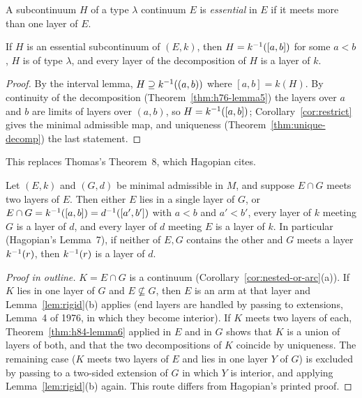 A subcontinuum $H$ of a type $\lambda$ continuum $E$ is \emph{essential} in $E$ if it meets more than one layer of $E$.

\begin{theorem}\label{thm:h84-lemma6}
If $H$ is an essential subcontinuum of $(E,k)$, then $H=k^{-1}([a,b])$ for some $a<b$, $H$ is of type $\lambda$, and every
layer of the decomposition of $H$ is a layer of $k$.
\end{theorem}

\begin{proof}
By the interval lemma, $H\supseteq k^{-1}((a,b))$ where $[a,b]=k(H)$. By continuity of the decomposition
(Theorem~\ref{thm:h76-lemma5}) the layers over $a$ and $b$ are limits of layers over $(a,b)$, so $H=k^{-1}([a,b])$;
Corollary~\ref{cor:restrict} gives the minimal admissible map, and uniqueness (Theorem~\ref{thm:unique-decomp}) the last
statement.
\end{proof}


This replaces Thomas's Theorem~8, which Hagopian cites.

\begin{theorem}\label{thm:layers-agree}
Let $(E,k)$ and $(G,d)$ be minimal admissible in $M$, and suppose $E\cap G$ meets two layers of $E$. Then either $E$ lies in a
single layer of $G$, or $E\cap G=k^{-1}([a,b])=d^{-1}([a',b'])$ with $a<b$ and $a'<b'$, every layer of $k$ meeting $G$ is a layer
of $d$, and every layer of $d$ meeting $E$ is a layer of $k$. In particular (Hagopian's Lemma~7), if neither of $E,G$
contains the other and $G$ meets a layer $k^{-1}(r)$, then $k^{-1}(r)$ is a layer of $d$.
\end{theorem}

\begin{proof}[Proof in outline]
$K=E\cap G$ is a continuum (Corollary~\ref{cor:nested-or-arc}(a)). If $K$ lies in one layer of $G$ and $E\not\subseteq G$, then
$E$ is an arm at that layer and Lemma~\ref{lem:rigid}(b) applies (end layers are handled by passing to extensions,
Lemma~4 of 1976, in which they become interior). If $K$ meets two layers of each, Theorem~\ref{thm:h84-lemma6} applied in
$E$ and in $G$ shows that $K$ is a union of layers of both, and that the two decompositions of $K$ coincide by
uniqueness. The remaining case ($K$ meets two layers of $E$ and lies in one layer $Y$ of $G$) is excluded by passing to a
two-sided extension of $G$ in which $Y$ is interior, and applying Lemma~\ref{lem:rigid}(b) again. This route differs from
Hagopian's printed proof.
\end{proof}

